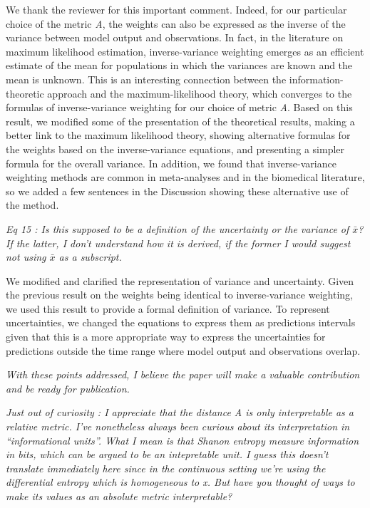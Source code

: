 We thank the reviewer for this important comment. Indeed, for our
particular choice of the metric \emph{A}, the weights can also be
expressed as the inverse of the variance between model output and
observations. In fact, in the literature on maximum likelihood
estimation, inverse-variance weighting emerges as an efficient estimate
of the mean for populations in which the variances are known and the
mean is unknown. This is an interesting connection between the
information-theoretic approach and the maximum-likelihood theory, which
converges to the formulas of inverse-variance weighting for our choice
of metric \emph{A}. Based on this result, we modified some of the
presentation of the theoretical results, making a better link to the
maximum likelihood theory, showing alternative formulas for the weights
based on the inverse-variance equations, and presenting a simpler
formula for the overall variance. In addition, we found that
inverse-variance weighting methods are common in meta-analyses and in
the biomedical literature, so we added a few sentences in the Discussion
showing these alternative use of the method.

\emph{Eq 15 : Is this supposed to be a definition of the uncertainty or
the variance of \(\bar{x}\)? If the latter, I don't understand how it is
derived, if the former I would suggest not using \(\bar{x}\) as a
subscript.}

We modified and clarified the representation of variance and
uncertainty. Given the previous result on the weights being identical to
inverse-variance weighting, we used this result to provide a formal
definition of variance. To represent uncertainties, we changed the
equations to express them as predictions intervals given that this is a
more appropriate way to express the uncertainties for predictions
outside the time range where model output and observations overlap.

\emph{With these points addressed, I believe the paper will make a
valuable contribution and be ready for publication.}

\emph{Just out of curiosity : I appreciate that the distance A is only
interpretable as a relative metric. I've nonetheless always been curious
about its interpretation in ``informational units''. What I mean is that
Shanon entropy measure information in bits, which can be argued to be an
intepretable unit. I guess this doesn't translate immediately here since
in the continuous setting we're using the differential entropy which is
homogeneous to x. But have you thought of ways to make its values as an
absolute metric interpretable?}

